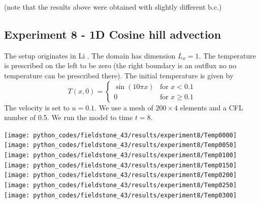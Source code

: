 (note that the results above were obtained with slightly different b.c.)

\newpage
\subsection*{Experiment 8 - 1D Cosine hill advection}

The setup originates in Li \cite[ex 5.2]{li06}.
The domain has dimension $L_x=1$. 
The temperature is prescribed on the left to be zero (the right boundary is an outflux
no no temperature can be prescribed there).
The initial temperature is given by
\[
T(x,0)=
\left\{
\begin{array}{ll}
\sin (10 \pi x) & \textrm{for } x< 0.1 \\
0               & \textrm{for } x\geq 0.1 
\end{array}
\right.
\]
The velocity is set to $u=0.1$.
We use a mesh of $200\times 4$ elements and a CFL number of 0.5. 
We run the model to time $t=8$.

\begin{center}
\texttt{[image: python\_codes/fieldstone\_43/results/experiment8/Temp0000]}
\texttt{[image: python\_codes/fieldstone\_43/results/experiment8/Temp0050]}
\texttt{[image: python\_codes/fieldstone\_43/results/experiment8/Temp0100]}
\texttt{[image: python\_codes/fieldstone\_43/results/experiment8/Temp0150]}\\
\texttt{[image: python\_codes/fieldstone\_43/results/experiment8/Temp0200]}
\texttt{[image: python\_codes/fieldstone\_43/results/experiment8/Temp0250]}
\texttt{[image: python\_codes/fieldstone\_43/results/experiment8/Temp0300]}
\end{center}

